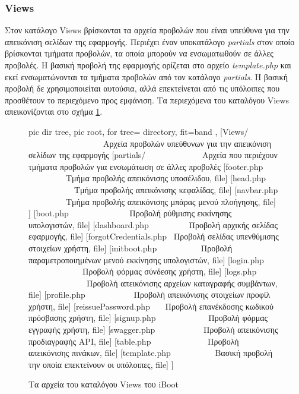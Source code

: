 \subsubsection{Views} \label{ui:app:views}
Στον κατάλογο Views βρίσκονται τα αρχεία προβολών που είναι υπεύθυνα για την απεικόνιση σελίδων της εφαρμογής. Περιέχει έναν υποκατάλογο \emph{partials} στον οποίο βρίσκονται τμήματα προβολών, τα οποία μπορούν να ενσωματωθούν σε άλλες προβολές. Η βασική προβολή της εφαρμογής ορίζεται στο αρχείο \emph{template.php} και εκεί ενσωματώνονται τα τμήματα προβολών από τον κατάλογο \emph{partials}. Η βασική προβολή δε χρησιμοποιείται αυτούσια, αλλά επεκτείνεται από τις υπόλοιπες που προσθέτουν το περιεχόμενο προς εμφάνιση. Τα περιεχόμενα του καταλόγου Views απεικονίζονται στο σχήμα \ref{dir:iBoot-Views}.

\begin{figure}
	\centering
	{\footnotesize
		\begin{forest}
			pic dir tree,
			pic root,
			for tree={%
				directory,
				fit=band
			},
			[Views/ \ \ \ \ \ \ \ \ \ \ \ \ \ \ \ \ \ \ Αρχεία προβολών υπεύθυνων για την απεικόνιση σελίδων της εφαρμογής
				[partials/ \ \ \ \ \ \ \ \ \ \ \ \ \ Αρχεία που περιέχουν τμήματα προβολών για ενσωμάτωση σε άλλες προβολές
					[footer.php \ \ \ \ \ \ \ \ \ Τμήμα προβολής απεικόνισης υποσέλιδου, file]
					[head.php \ \ \ \ \ \ \ \ \ \ \ Τμήμα προβολής απεικόνισης κεφαλίδας, file]
					[navbar.php \ \ \ \ \ \ \ \ \ Τμήμα προβολής απεικόνισης μπάρας μενού πλοήγησης, file]
				]
				[boot.php \ \ \ \ \ \ \ \ \ \ \ \ \ \ Προβολή ρύθμισης εκκίνησης υπολογιστών, file]
				[dashboard.php \ \ \ \ \ \ \ \ \ Προβολή αρχικής σελίδας εφαρμογής, file]
				[forgotCredentials.php \ Προβολή σελίδας υπενθύμισης στοιχείων χρήστη, file]
				[initboot.php \ \ \ \ \ \ \ \ \ \ Προβολή παραμετροποιημένων μενού εκκίνησης υπολογιστών, file]
				[login.php \ \ \ \ \ \ \ \ \ \ \ \ \ Προβολή φόρμας σύνδεσης χρήστη, file]
				[logs.php \ \ \ \ \ \ \ \ \ \ \ \ \ \ Προβολή απεικόνισης αρχείων καταγραφής συμβάντων, file]
				[profile.php \ \ \ \ \ \ \ \ \ \ \ Προβολή απεικόνισης στοιχείων προφίλ χρήστη, file]
				[reissuePassword.php \ \ \ Προβολή επανέκδοσης κωδικού πρόσβασης χρήστη, file]
				[signup.php \ \ \ \ \ \ \ \ \ \ \ \ Προβολή φόρμας εγγραφής χρήστη, file]
				[swagger.php \ \ \ \ \ \ \ \ \ \ \ Προβολή απεικόνισης προδιαγραφής API, file]
				[table.php \ \ \ \ \ \ \ \ \ \ \ \ \ Προβολή απεικόνισης πινάκων, file]
				[template.php \ \ \ \ \ \ \ \ \ \ Βασική προβολή την οποία επεκτείνουν οι υπόλοιπες, file]
			]
		\end{forest}
	}
	\caption{Τα αρχεία του καταλόγου Views του iBoot}
	\label{dir:iBoot-Views}
\end{figure}
\FloatBarrier

